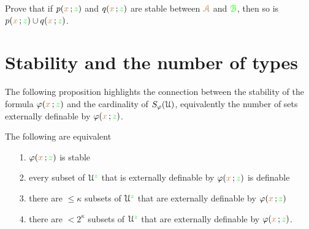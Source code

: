   
  
  
  

  \begin{exercise}\label{ex_stability_conjunction}
    Prove that if $p({\color{brown} x}\,;{\color{green} z})$ and $q({\color{brown} x}\,;{\color{green} z})$ are stable between ${\color{brown}\EuScript A}$ and ${\color{green}\EuScript B}$, then so is $p({\color{brown} x}\,;{\color{green} z})\cup q({\color{brown} x}\,;{\color{green} z})$.
  \end{exercise}

\section{Stability and the number of types}


The following proposition highlights the connection between the stability of the formula $\varphi({\color{brown} x}\,;{\color{green} z})$ and the cardinality of $S_\varphi(\EuScript U)$, equivalently the number of sets externally definable by $\varphi({\color{brown} x}\,;{\color{green} z})$. 

\begin{theorem}\label{thm_def_stable_formula2}
   The following are equivalent
   \begin{itemize}
     \item[1.] $\varphi({\color{brown} x}\,;{\color{green} z})$ is stable
     \item[2.] every subset of $\EuScript U^{\color{green} z}$ that is externally definable by $\varphi({\color{brown} x}\,;{\color{green} z})$ is definable
     \item[3.] there are $\le\kappa$ subsets of $\EuScript U^{\color{green} z}$ that are externally definable by $\varphi({\color{brown} x}\,;{\color{green} z})$
     \item[4.] there are $<2^\kappa$ subsets of $\EuScript U^{\color{green} z}$ that are externally definable by $\varphi({\color{brown} x}\,;{\color{green} z})$.
   \end{itemize}
 \end{theorem}
 
